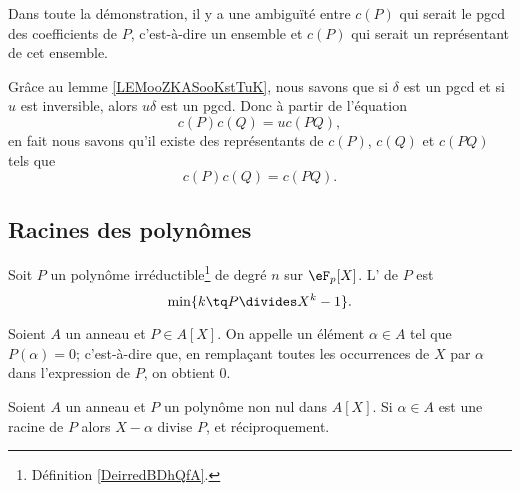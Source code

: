 \begin{normaltext}
	Dans toute la démonstration, il y a une ambiguïté entre \( c(P)\) qui serait le pgcd des coefficients de \( P\), c'est-à-dire un ensemble et \( c(P)\) qui serait un représentant de cet ensemble.

	Grâce au lemme \ref{LEMooZKASooKstTuK}, nous savons que si \( \delta\) est un pgcd et si \( u\) est inversible, alors \( u\delta\) est un pgcd. Donc à partir de l'équation
	\begin{equation}
		c(P)c(Q)=uc(PQ),
	\end{equation}
	en fait nous savons qu'il existe des représentants de \( c(P)\), \( c(Q) \) et \( c(PQ)\) tels que
	\begin{equation}
		c(P)c(Q)=c(PQ).
	\end{equation}
\end{normaltext}

\subsection{Racines des polynômes}


\begin{definition}
	Soit \( P\) un polynôme irréductible\footnote{Définition \ref{DeirredBDhQfA}.} de degré \( n\) sur \( \eF_p[X]\). L' de \( P\) est
	\begin{equation}
		\min\{ k\tq P\divides X^k-1 \}.
	\end{equation}
\end{definition}


\begin{definition}
	Soient \( A \) un anneau et \( P \in A[X] \). On appelle
	 un élément \( \alpha \in A \)
	tel que \( P(\alpha) = 0 \); c'est-à-dire que, en remplaçant toutes
	les occurrences de \( X\) par \( \alpha\) dans l'expression de \( P\), on
	obtient \( 0\).
\end{definition}

\begin{proposition} \label{PropHSQooASRbeA}
	Soient \( A\) un anneau et \( P\) un polynôme non nul dans \( A[X]\). Si \( \alpha\in A\) est une racine de \( P\) alors \( X-\alpha\) divise \( P\), et réciproquement.
\end{proposition}


